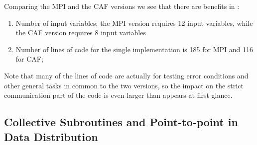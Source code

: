 \documentclass{IOS-Book-Article}
\begin{document}
Comparing the  MPI and the CAF versions we see that there are benefits
in : 
\begin{enumerate}
\item Number of input variables: the MPI version requires 12 input
  variables, while the CAF version requires 8 input variables 
\item Number of lines of code for the single implementation is 185 for
  MPI and 116 for CAF;  
\end{enumerate}
Note that many of the lines of code are actually for testing error
conditions and other general tasks in common to the two versions, so
the impact on the strict communication part of the code is even larger
than appears at first glance. 
  
\subsection{Collective Subroutines and Point-to-point in Data Distribution}
\end{document}
